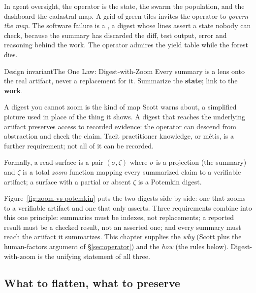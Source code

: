 \documentclass[11pt,a4paper]{article}
\theoremstyle{definition}
\theoremstyle{plain}
\begin{document}
In agent oversight, the operator is the state, the swarm the population, and the
dashboard the cadastral map. A grid of green tiles invites the operator to
\emph{govern the map}. The software failure is a , a
digest whose lines assert a state nobody can check, because the summary has
discarded the diff, test output, error and reasoning behind the work. The operator admires the
yield table while the forest dies.

\ifdefined\pdreflectionplate{}\fi


\begin{pdclaim}{Design invariant}{The One Law: Digest-with-Zoom}
\setlength{\parskip}{4pt plus 1pt}
\label{def:zoom}
Every summary is a lens onto the real artifact, never a replacement for it.
Summarize the \textbf{state}; link to the \textbf{work}.

A digest you cannot zoom is
the kind of map Scott warns about, a simplified picture used in place of the thing it shows. A digest that reaches the underlying artifact preserves
access to recorded evidence: the operator can descend from abstraction and check
the claim. Tacit practitioner knowledge, or m\^etis, is a further requirement;
not all of it can be recorded.

Formally, a read-surface is a pair $(\sigma, \zeta)$ where $\sigma$ is a
projection (the summary) and $\zeta$ is a total \emph{zoom} function mapping every
summarized claim to a verifiable artifact; a surface with a partial or absent
$\zeta$ is a Potemkin digest.
\end{pdclaim}



Figure~\ref{fig:zoom-vs-potemkin} puts the two digests side by side: one that zooms
to a verifiable artifact and one that only asserts. Three requirements combine into
this one principle: summaries must be indexes, not
replacements; a reported result must be a checked result, not an asserted one; and
every summary must reach the artifact it summarizes. This chapter supplies the
\emph{why} (Scott plus the human-factors argument of \S\ref{sec:operator}) and the
\emph{how} (the rules below). Digest-with-zoom is the unifying statement of all three.

\subsection{What to flatten, what to preserve}\label{sec:flatten}
\end{document}
